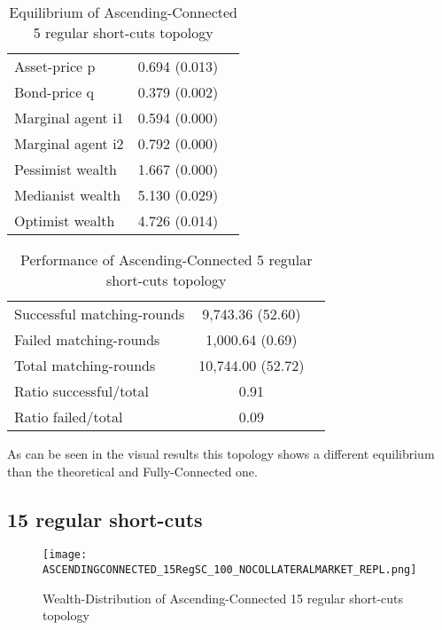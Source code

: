 \documentclass[Bachelorarbeit.tex]{subfiles}
\begin{document}
\begin{table}[H]
	\caption{Equilibrium of Ascending-Connected 5 regular short-cuts topology}
	\centering
	\begin{tabular} { l c r }
		\hline
		Asset-price p & 0.694 (0.013) \\
		Bond-price q & 0.379 (0.002) \\
		Marginal agent i1 & 0.594 (0.000) \\
		Marginal agent i2 & 0.792 (0.000) \\
		\hline
		Pessimist wealth & 1.667 (0.000) \\
		Medianist wealth & 5.130 (0.029) \\
		Optimist wealth & 4.726 (0.014) \\
		\hline
	\end{tabular}
\end{table} 

\begin{table}[H]
	\caption{Performance of Ascending-Connected 5 regular short-cuts topology}
	\centering
	\begin{tabular} { l c r }
		\hline
		Successful matching-rounds & 9,743.36 (52.60) \\
		Failed matching-rounds & 1,000.64 (0.69) \\
		Total matching-rounds & 10,744.00 (52.72) \\
		\hline
		Ratio successful/total & 0.91 \\
		Ratio failed/total & 0.09 \\
		\hline
	\end{tabular}
\end{table}

As can be seen in the visual results this topology shows a different equilibrium than the theoretical and Fully-Connected one.

\subsection{15 regular short-cuts}
\begin{figure}[H]
	\centering
  \texttt{[image: ASCENDINGCONNECTED\_15RegSC\_100\_NOCOLLATERALMARKET\_REPL.png]}
	\caption{Wealth-Distribution of Ascending-Connected 15 regular short-cuts topology}
	\label{fig:wealth_ASCENDINGCONNECTED_15RegSC_100_NOCOLLATERALMARKET_REPL}
\end{figure}
\end{document}
